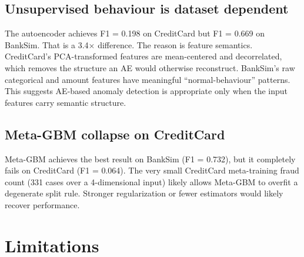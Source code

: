 \documentclass[11pt]{article}
\begin{document}
\subsection{Unsupervised behaviour is dataset dependent}
The autoencoder achieves F1 = 0.198 on CreditCard but F1 = 0.669 on BankSim. That is a 3.4$\times$ difference. The reason is feature semantics. CreditCard's PCA-transformed features are mean-centered and decorrelated, which removes the structure an AE would otherwise reconstruct. BankSim's raw categorical and amount features have meaningful ``normal-behaviour'' patterns. This suggests AE-based anomaly detection is appropriate only when the input features carry semantic structure.

\subsection{Meta-GBM collapse on CreditCard}
Meta-GBM achieves the best result on BankSim (F1 = 0.732), but it completely fails on CreditCard (F1 = 0.064). The very small CreditCard meta-training fraud count (331 cases over a 4-dimensional input) likely allows Meta-GBM to overfit a degenerate split rule. Stronger regularization or fewer estimators would likely recover performance.

\section{Limitations}
\end{document}
